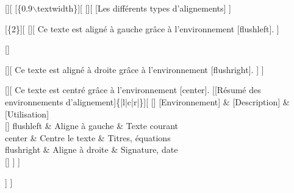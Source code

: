 [][
    [\{0.9$\backslash$textwidth\}][
    [][
    [Les différents types d'alignements]
    ]
    
    [\{2\}][
    [][
    Ce texte est aligné à gauche grâce à l'environnement [flushleft].
    ]
    
    []
    
    [][
    Ce texte est aligné à droite grâce à l'environnement [flushright].
    ]
    ]
    
    [][
    Ce texte est centré grâce à l'environnement [center].
	[[Résumé des environnements d'alignement]\{|l|c|r|\}][
	    [Environnement] \& [Description] \& [Utilisation] \\
	    flushleft \& Aligne à gauche \& Texte courant \\
	    center \& Centre le texte \& Titres, équations \\
	    flushright \& Aligne à droite \& Signature, date \\
	]
    ]
    
    
    ]
    ]